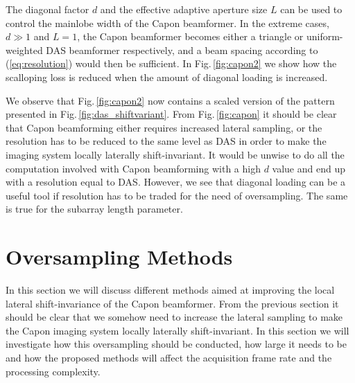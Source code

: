 \documentclass[draftcls]{IEEEtran}
\newcommand{\img}{img/}
\begin{document}
The diagonal factor $d$ and the effective adaptive aperture size $L$ can be used to control the mainlobe width of the Capon beamformer. In the extreme cases, $d\gg1$ and $L=1$, the Capon beamformer becomes either a triangle or uniform-weighted DAS beamformer respectively, and a beam spacing according to (\ref{eq:resolution}) would then be sufficient. In Fig.\,\ref{fig:capon2} we show how the scalloping loss is reduced when the amount of diagonal loading is increased. 

We observe that Fig.\,\ref{fig:capon2} now contains a scaled version of the pattern presented in Fig.\,\ref{fig:das_shiftvariant}. From Fig.\,\ref{fig:capon} it should be clear that Capon beamforming either requires increased lateral sampling, or the resolution has to be reduced to the same level as DAS in order to make the imaging system locally laterally shift-invariant. It would be unwise to do all the computation involved with Capon beamforming with a high $d$ value and end up with a resolution equal to DAS. However, we see that diagonal loading can be a useful tool if resolution has to be traded for the need of oversampling. The same is true for the subarray length parameter.

\begin{figure*}[!t]
\centerline{
}
\caption{LSV-plots of Capon beamforming with $L=M/2=48$ and $K=1$, and with sampling corresponding to (\ref{eq:resolution}). a) Capon beamforming with $d=1/100$ as diagonal loading. The system is not locally laterally shift-invariant. b) The diagonal loading factor $d$ is increased to 1. The scalloping loss is reduced, but the system is still not locally laterally shift-invariant.}
\label{fig:capon}
\end{figure*}

\section{Oversampling Methods}\label{sec:methods}
In this section we will discuss different methods aimed at improving the local lateral shift-invariance of the Capon beamformer. From the previous section it should be clear that we somehow need to increase the lateral sampling to make the Capon imaging system locally laterally shift-invariant. In this section we will investigate how this oversampling should be conducted, how large it needs to be and how the proposed methods will affect the acquisition frame rate and the processing complexity.
\end{document}
